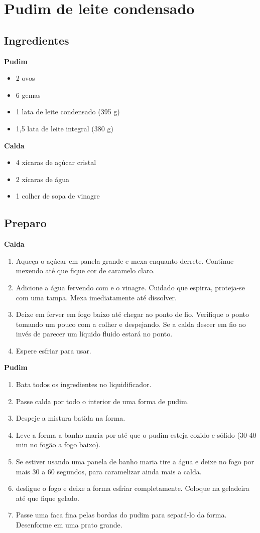 \section{Pudim de leite condensado}
\subsection{Ingredientes}
\textbf{Pudim}
\begin{itemize}
\item 2 ovos
\item 6 gemas
\item 1 lata de leite condensado (395 g)
\item 1,5 lata de leite integral (380 g)
\end{itemize}
\textbf{Calda}
\begin{itemize}
\item 4 xícaras de açúcar cristal
\item 2 xícaras de água
\item 1 colher de sopa de vinagre
\end{itemize}
\subsection{Preparo}
\textbf{Calda}
\begin{enumerate}
\item Aqueça o açúcar em panela grande e mexa enquanto derrete. Continue mexendo até que fique cor de caramelo claro.
\item Adicione a água fervendo com e o vinagre. Cuidado que espirra, proteja-se com uma tampa.  Mexa imediatamente até dissolver.
\item Deixe em ferver em fogo baixo até chegar ao ponto de fio. Verifique o ponto tomando um pouco com a colher e despejando. Se a calda descer em fio ao invés de parecer um líquido fluido estará no ponto.
\item Espere esfriar para usar.
\end{enumerate}
\textbf{Pudim}
\begin{enumerate}
\item Bata todos os ingredientes no liquidificador.
\item Passe calda por todo o interior de uma forma de pudim.
\item Despeje a mistura batida na forma.
\item Leve a forma a banho maria por até que o pudim esteja cozido e sólido (30-40 min no fogão a fogo baixo).
\item Se estiver usando uma panela de banho maria tire a água e deixe no fogo por mais 30 a 60 segundos, para caramelizar ainda mais a calda.
\item desligue o fogo e deixe a forma esfriar completamente. Coloque na geladeira até que fique gelado.
\item Passe uma faca fina pelas bordas do pudim para separá-lo da forma. Desenforme em uma prato grande.
\end{enumerate}
